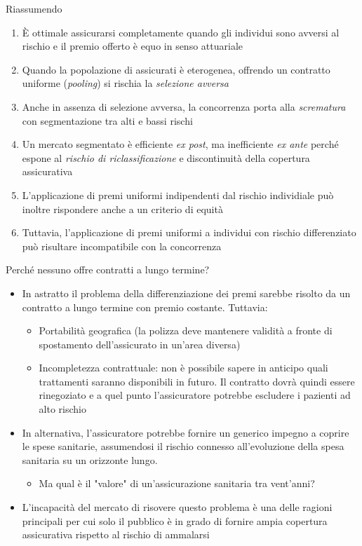\documentclass[aspectratio=149,11pt]{beamer}
\begin{document}
\begin{frame}{Riassumendo}
\begin{enumerate}
\item È ottimale assicurarsi completamente quando gli individui sono avversi al
rischio e il premio offerto è equo in senso attuariale
\item Quando la popolazione di assicurati è eterogenea, offrendo un contratto
uniforme (\emph{pooling}) si rischia la \emph{selezione avversa}
\item Anche in assenza di selezione avversa, la concorrenza porta alla
\emph{scrematura} con segmentazione tra alti e bassi rischi
\item Un mercato segmentato è efficiente \emph{ex post}, ma inefficiente \emph{ex ante}
perché espone al \emph{rischio di riclassificazione} e discontinuità della
copertura assicurativa
\item L'applicazione di premi uniformi indipendenti dal rischio individiale può
inoltre rispondere anche a un criterio di equità
\item Tuttavia, l'applicazione di premi uniformi a individui con rischio
differenziato può risultare incompatibile con la concorrenza
\end{enumerate}
\end{frame}

\begin{frame}{Perché nessuno offre contratti a lungo termine?}
\begin{itemize}
\item In astratto il problema della differenziazione dei premi sarebbe risolto da
un contratto a lungo termine con premio costante. Tuttavia:
\begin{itemize}
\item Portabilità geografica (la polizza deve mantenere validità a fronte di
spostamento dell'assicurato in un'area diversa)
\item Incompletezza contrattuale: non è possibile sapere in anticipo quali
trattamenti saranno disponibili in futuro. Il contratto dovrà quindi
essere rinegoziato e a quel punto l'assicuratore potrebbe escludere i
pazienti ad alto rischio
\end{itemize}
\item In alternativa, l'assicuratore potrebbe fornire un generico impegno a
coprire le spese sanitarie, assumendosi il rischio connesso all'evoluzione
della spesa sanitaria su un orizzonte lungo.
\begin{itemize}
\item Ma qual è il "valore" di un'assicurazione sanitaria tra vent'anni?
\end{itemize}
\item L'incapacità del mercato di risovere questo problema è una delle ragioni
principali per cui solo il pubblico è in grado di fornire ampia copertura
assicurativa rispetto al rischio di ammalarsi
\end{itemize}
\end{frame}
\end{document}
